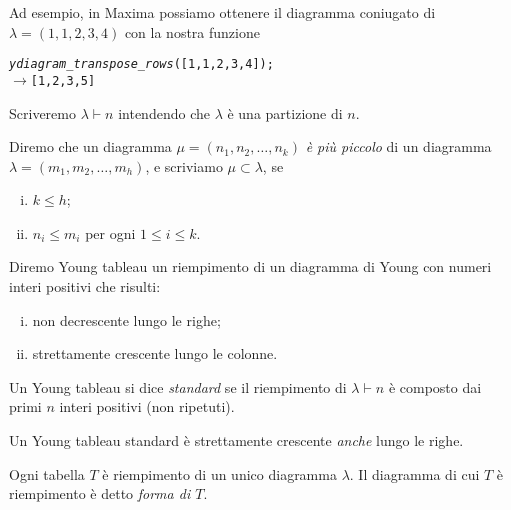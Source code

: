 Ad esempio, in Maxima possiamo ottenere il diagramma coniugato di
$\lambda=(1,1,2,3,4)$ con la nostra funzione
\begin{alltt}
\emph{ydiagram\_transpose\_rows} ([1,1,2,3,4]);
\(\rightarrow\) [1,2,3,5]
\end{alltt}


\begin{notaz}
Scriveremo $\lambda \vdash n$ intendendo che $\lambda$ \`e una
partizione di $n$.
\end{notaz}

\begin{defn}
Diremo che un diagramma $\mu=(n_1,n_2,\dots,n_k)$ \emph{\`e pi\`u
piccolo} di un diagramma $\lambda=(m_1,m_2,\dots,m_h)$, e scriviamo
$\mu \subset \lambda$, se
\begin{enumerate}[(i)]
\item $k \leq h$;
\item $n_i \leq m_i$ per ogni $1 \leq i \leq k$.
\end{enumerate}
\end{defn}

\begin{defn}\label{ytab}
Diremo Young tableau un riempimento di un diagramma di Young con
numeri interi positivi che risulti:
\begin{enumerate}[(i)]
\item non decrescente lungo le righe;
\item strettamente crescente lungo le colonne.
\end{enumerate}
Un Young tableau si dice \emph{standard} se il riempimento di
$\lambda \vdash n$ \`e composto dai primi $n$ interi positivi (non
ripetuti).
\end{defn}

\begin{oss}
Un Young tableau standard \`e strettamente crescente \emph{anche}
lungo le righe.
\end{oss}

\begin{oss}
Ogni tabella $T$ \`e riempimento di un unico diagramma $\lambda$. Il
diagramma di cui $T$ \`e riempimento \`e detto \emph{forma di $T$}.
\end{oss}

